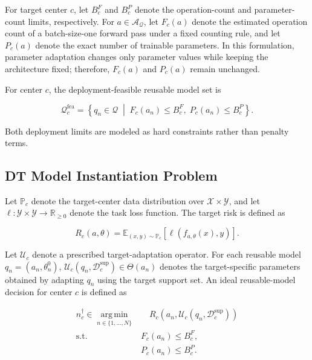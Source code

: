 \documentclass[a4paper,fleqn]{cas-sc}
\begin{document}
For target center $c$, let $B_c^{F}$ and $B_c^{P}$ denote the operation-count
and parameter-count limits, respectively. For
$a\in\mathcal{A}_{\mathcal{Q}}$, let $F_c(a)$ denote the estimated operation
count of a batch-size-one forward pass under a fixed counting rule, and let
$P_c(a)$ denote the exact number of trainable parameters. In this formulation,
parameter adaptation changes only parameter values while keeping the
architecture fixed; therefore, $F_c(a)$ and $P_c(a)$ remain unchanged.

For center $c$, the deployment-feasible reusable model set is

\begin{equation}
\mathcal{Q}_{c}^{\mathrm{fea}}
=
\left\{
q_n\in\mathcal{Q}
\;\middle|\;
F_c(a_n)\leq B_c^{F},
\;
P_c(a_n)\leq B_c^{P}
\right\}.
\label{eq:feasible-candidate-set}
\end{equation}

Both deployment limits are modeled as hard constraints rather than penalty
terms.

\subsection{DT Model Instantiation Problem}

Let $\mathbb{P}_c$ denote the target-center data distribution over
$\mathcal{X}\times\mathcal{Y}$, and let
$\ell:\mathcal{Y}\times\mathcal{Y}\rightarrow\mathbb{R}_{\geq 0}$ denote the
task loss function. The target risk is defined as

\begin{equation}
R_c(a,\theta)
=
\mathbb{E}_{(x,y)\sim\mathbb{P}_c}
\left[
\ell(f_{a,\theta}(x),y)
\right].
\label{eq:target-risk}
\end{equation}

Let $\mathcal{U}_c$ denote a prescribed target-adaptation operator. For each
reusable model $q_n=(a_n,\theta_n^0)$,
$\mathcal{U}_c(q_n,\mathcal{D}_c^{\mathrm{sup}})\in\Theta(a_n)$ denotes
the target-specific parameters obtained by adapting $q_n$ using the target
support set. An ideal reusable-model decision for center $c$ is defined as

\begin{equation}
\begin{aligned}
n_c^\dagger
\in
\operatorname*{arg\,min}_{n\in\{1,\ldots,N\}}
&\quad
R_c\!\left(
a_n,
\mathcal{U}_c(q_n,\mathcal{D}_c^{\mathrm{sup}})
\right)
\\
\mathrm{s.t.}\quad
&F_c(a_n)\leq B_c^F,
\\
&P_c(a_n)\leq B_c^P.
\end{aligned}
\label{eq:instantiation-problem}
\end{equation}
\end{document}
